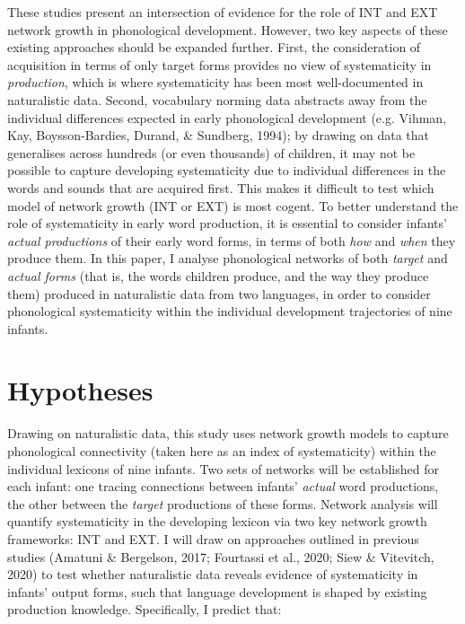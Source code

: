 \documentclass[
  man]{apa6}
\begin{document}
These studies present an intersection of evidence for the role of INT and EXT network growth in phonological development. However, two key aspects of these existing approaches should be expanded further. First, the consideration of acquisition in terms of only target forms provides no view of systematicity in \emph{production}, which is where systematicity has been most well-documented in naturalistic data. Second, vocabulary norming data abstracts away from the individual differences expected in early phonological development (e.g. Vihman, Kay, Boysson-Bardies, Durand, \& Sundberg, 1994); by drawing on data that generalises across hundreds (or even thousands) of children, it may not be possible to capture developing systematicity due to individual differences in the words and sounds that are acquired first. This makes it difficult to test which model of network growth (INT or EXT) is most cogent. To better understand the role of systematicity in early word production, it is essential to consider infants' \emph{actual productions} of their early word forms, in terms of both \emph{how} and \emph{when} they produce them. In this paper, I analyse phonological networks of both \emph{target} and \emph{actual forms} (that is, the words children produce, and the way they produce them) produced in naturalistic data from two languages, in order to consider phonological systematicity within the individual development trajectories of nine infants.

\hypertarget{hypotheses}{%
\section{Hypotheses}\label{hypotheses}}

Drawing on naturalistic data, this study uses network growth models to capture phonological connectivity (taken here as an index of systematicity) within the individual lexicons of nine infants. Two sets of networks will be established for each infant: one tracing connections between infants' \emph{actual} word productions, the other between the \emph{target} productions of these forms. Network analysis will quantify systematicity in the developing lexicon via two key network growth frameworks: INT and EXT. I will draw on approaches outlined in previous studies (Amatuni \& Bergelson, 2017; Fourtassi et al., 2020; Siew \& Vitevitch, 2020) to test whether naturalistic data reveals evidence of systematicity in infants' output forms, such that language development is shaped by existing production knowledge. Specifically, I predict that:
\end{document}

